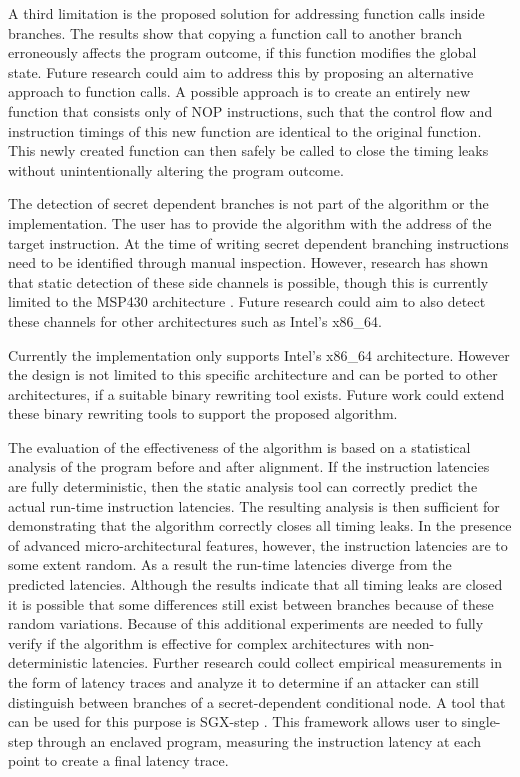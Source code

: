 A third limitation is the proposed solution for addressing function calls inside branches. 
The results show that copying a function call to another branch erroneously affects the 
program outcome, if this function modifies the global state. 
Future research could aim to address this by proposing an alternative approach to function calls. 
A possible approach is to create an entirely new function that consists only of NOP instructions, 
such that the control flow and instruction timings of this new function are identical to the original function. 
This newly created function can then safely be called to close the timing leaks without unintentionally altering the program outcome. 

The detection of secret dependent branches is not part of the algorithm or the implementation. 
The user has to provide the algorithm with the address of the target instruction. 
At the time of writing secret dependent branching instructions need to be identified through manual inspection. 
However, research has shown that static detection of these side channels is possible, though 
this is currently limited to the MSP430 architecture \cite{MSP430Detection}. Future research could aim to also detect these channels for other architectures such as Intel's x86\_64.

Currently the implementation only supports Intel's x86\_64 architecture. 
However the design is not limited to this specific architecture and can be ported to other architectures, if a suitable binary rewriting tool exists. 
Future work could extend these binary rewriting tools to support the proposed algorithm. 

The evaluation of the effectiveness of the algorithm is based on a statistical analysis of the program before and after alignment. 
If the instruction latencies are fully deterministic, then the static analysis tool can correctly predict the actual run-time instruction latencies. The resulting analysis 
is then sufficient for demonstrating that the algorithm correctly closes all timing leaks. 
In the presence of advanced micro-architectural features, however,  the instruction latencies are to some extent random. 
As a result the run-time latencies diverge from the predicted latencies. 
Although the results indicate that all timing leaks are closed it is possible that some differences still exist between branches because of these random variations. 
Because of this additional experiments are needed to fully verify if the algorithm is effective for complex architectures with non-deterministic latencies.
Further research could collect empirical measurements in the form of latency traces and analyze it to determine if an attacker can still distinguish between branches of a secret-dependent conditional node. 
A tool that can be used for this purpose is SGX-step \cite{sgx-step}. 
This framework allows user to single-step through an enclaved program, measuring the instruction latency at each point to create a final latency trace. 

